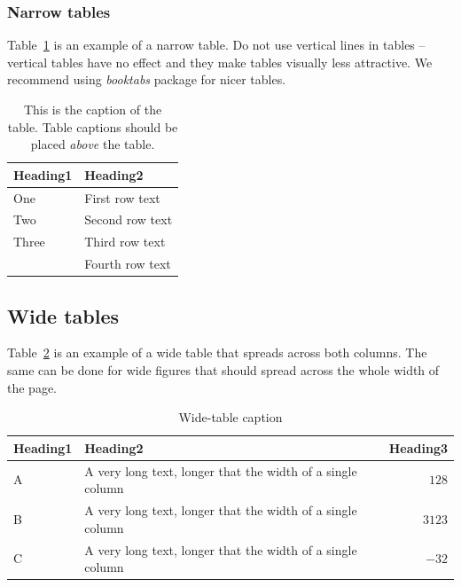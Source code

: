 \documentclass[10pt, a4paper]{article}
\begin{document}
\subsubsection{Narrow tables}

Table~\ref{tab:narrow-table} is an example of a narrow table. Do not use vertical lines in tables -- vertical tables have no effect and they make tables visually less attractive. We recommend using \textit{booktabs} package for nicer tables.

\begin{table}
\caption{This is the caption of the table. Table captions should be placed \textit{above} the table.}
\label{tab:narrow-table}
\begin{center}
\begin{tabular}{ll}
\toprule
Heading1 & Heading2 \\
\midrule
One & First row text \\
Two   & Second row text \\
Three   & Third row text \\
      & Fourth row text \\
\bottomrule
\end{tabular}
\end{center}
\end{table}

\subsection{Wide tables}

Table~\ref{tab:wide-table} is an example of a wide table that spreads across both columns. The same can be done for wide figures that should spread across the whole width of the page. 

\begin{table}
\caption{Wide-table caption}
\label{tab:wide-table}
\begin{center}
\begin{tabular}{llr}
\toprule
Heading1 & Heading2 & Heading3\\
\midrule
A & A very long text, longer that the width of a single column & $128$\\
B & A very long text, longer that the width of a single column & $3123$\\
C & A very long text, longer that the width of a single column & $-32$\\
\bottomrule
\end{tabular}
\end{center}
\end{table}
\end{document}
